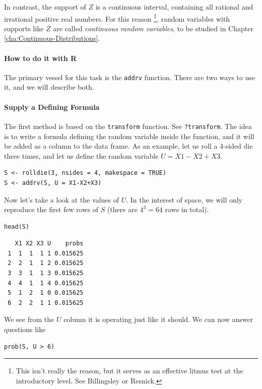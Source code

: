 \documentclass[captions=tableheading]{scrbook}
\begin{document}
In contrast, the support of \(Z\) is a continuous interval, containing all rational and irrational positive real numbers. For this reason
\footnote{This isn't really the reason, but it serves as an effective litmus test at the introductory level. See Billingsley or Resnick.},
random variables with supports like \(Z\) are called \emph{continuous random variables}, to be studied in Chapter \ref{cha:Continuous-Distributions}.

\paragraph*{How to do it with \textsf{R}}

The primary vessel for this task is the \texttt{addrv} function. There are two ways to use it, and we will describe both.

\paragraph*{Supply a Defining Formula}

The first method is based on the \texttt{transform} function. See \texttt{?transform}. The idea is to write a formula defining the random variable inside the function, and it will be added as a column to the data frame. As an example, let us roll a 4-sided die three times, and let us define the random variable \(U=X1-X2+X3\). 


\begin{verbatim}
S <- rolldie(3, nsides = 4, makespace = TRUE) 
S <- addrv(S, U = X1-X2+X3)
\end{verbatim}

Now let's take a look at the values of \(U\). In the interest of space, we will only reproduce the first few rows of \(S\) (there are \(4^{3}=64\) rows in total). 


\begin{verbatim}
head(S)
\end{verbatim}

\begin{verbatim}
   X1 X2 X3 U    probs
 1  1  1  1 1 0.015625
 2  2  1  1 2 0.015625
 3  3  1  1 3 0.015625
 4  4  1  1 4 0.015625
 5  1  2  1 0 0.015625
 6  2  2  1 1 0.015625
\end{verbatim}

We see from the \(U\) column it is operating just like it should. We can now answer questions like


\begin{verbatim}
prob(S, U > 6)
\end{verbatim}
\end{document}
